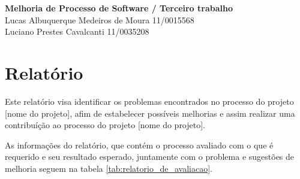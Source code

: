 \documentclass[a4paper, 11pt]{article}
\begin{document}
\noindent
\large\textbf{Melhoria de Processo de Software / Terceiro trabalho}\\
Lucas Albuquerque Medeiros de Moura \hfill 11/0015568 \\
Luciano Prestes Cavalcanti \hfill 11/0035208

\section*{Relatório}

Este relatório visa identificar os problemas encontrados no processo do
projeto [nome do projeto], afim de estabelecer possíveis melhorias e assim
realizar uma contribuíção ao processo do projeto [nome do projeto].

As informações do relatório, que contém o processo avaliado com o que é
requerido e seu resultado esperado, juntamente com o problema e sugestões
de melhoria seguem na tabela \ref{tab:relatorio_de_avaliacao}.

\begin{table}[h]
\centering
{}
\caption{Relatório de Avaliação}
\label{tab:relatorio_de_avaliacao}
\end{table}
\end{document}
